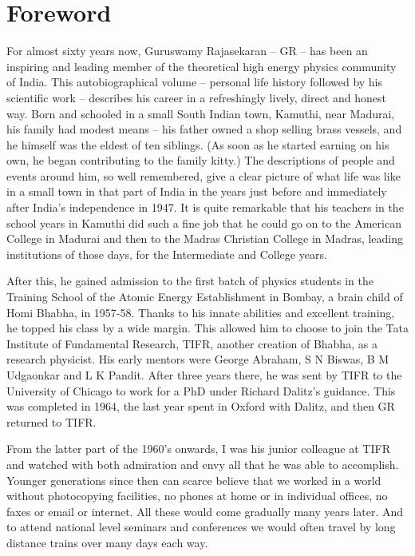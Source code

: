 \chapter{Foreword}\label{foreword}

For almost sixty years now, Guruswamy Rajasekaran – GR – has been an 
inspiring and leading member of the theoretical high energy physics 
community of India. This autobiographical volume – personal life 
history followed by his scientific work – des\-cribes his career in a 
refreshingly lively, direct and honest way. Born and schooled in a 
small South Indian town, Kamuthi, near Madurai, his family had modest 
means – his father owned a shop selling brass vessels, and he himself 
was the eldest of ten siblings. (As soon as he started earning on his 
own, he began contributing to the family kitty.) The descriptions of 
people and events around him, so well remembered, give a clear picture 
of what life was like in a small town in that part of India in the 
years just before and immediately after India’s independence in 1947. It 
is quite remarkable that his teachers in the school years in Kamuthi 
did such a fine job that he could go on to the American College in 
Madurai and then to the Madras Christian College in Madras, leading 
institutions of those days, for the Intermediate and College years.

After this, he gained admission to the first batch of physics students 
in the Training School of the Atomic Energy Establishment in Bombay, a 
brain child of Homi Bhabha, in 1957-58. Tha\-nks to his innate abilities 
and excellent training, he topped his class by a wide margin. This 
allowed him to choose to join the Tata Institute of Fundamental 
Research, TIFR, another creation of Bha\-bha, as a research physicist. 
His early mentors were Geo\-rge Abraham, S N Biswas, B M Udgaonkar and L 
K Pandit. After three years there, he was sent by TIFR to the 
University of Chicago to work for a PhD under Richard Dalitz’s 
guidance. This was completed in 1964, the last year spent in Oxford 
with Dalitz, and then GR returned to TIFR.


From the latter part of the 1960’s onwards, I was his junior colleague 
at TIFR and watched with both admiration and envy all that he was able 
to accomplish. Younger generations since then can scarce believe that 
we worked in a world without photo\-copying facilities, no phones at home 
or in individual offices, no faxes or email or internet. All these 
would come gradually many years later. And to attend national level 
seminars and confe\-rences we would often travel by long distance trains 
over many days each way.

